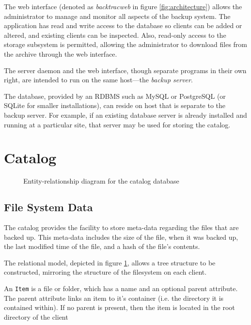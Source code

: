 The web interface (denoted as \emph{backtracweb} in figure
\ref{fig:architecture}) allows the administrator to manage and monitor all
aspects of the backup system. The application has read and write access to the
database so clients can be added or altered, and existing clients can be
inspected. Also, read-only access to the storage subsystem is permitted,
allowing the administrator to download files from the archive through the web
interface.

The server daemon and the web interface, though separate programs in their own
right, are intended to run on the same host---the \emph{backup server}.

The database, provided by an RDBMS such as MySQL or PostgreSQL (or SQLite for
smaller installations), can reside on host that is separate to the backup
server. For example, if an existing database server is already installed and
running at a particular site, that server may be used for storing the catalog.

\section{Catalog}

\begin{figure}
    \begin{center}
        \newlength{\svgwidth}
        \setlength{\svgwidth}{1.1\textwidth}
        \tiny
        
    \end{center}
    \caption{Entity-relationship diagram for the catalog database}
    \label{fig:erd}
\end{figure}

\subsection{File System Data}

The catalog provides the facility to store meta-data regarding the files that
are backed up. This meta-data includes the size of the file, when it was backed
up, the last modified time of the file, and a hash of the file's contents.

The relational model, depicted in figure \ref{fig:erd}, allows a tree structure
to be constructed, mirroring the structure of the filesystem on each client.

An \verb!Item! is a file or folder, which has a name and an optional parent
attribute. The parent attribute links an item to it's container (i.e. the
directory it is contained within). If no parent is present, then the item is
located in the root directory of the client

